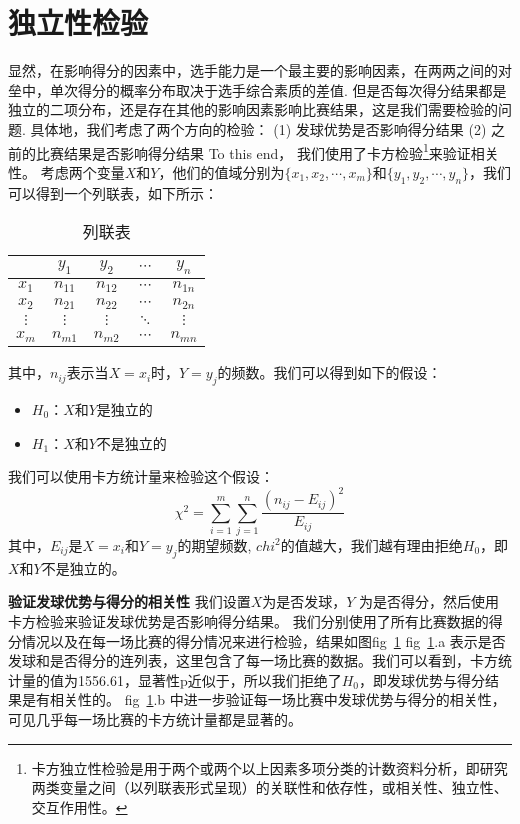 \documentclass{mcmthesis}
\begin{document}
\section{独立性检验}
显然，在影响得分的因素中，选手能力是一个最主要的影响因素，在两两之间的对垒中，单次得分的概率分布取决于选手综合素质的差值. 
但是否每次得分结果都是独立的二项分布，还是存在其他的影响因素影响比赛结果，这是我们需要检验的问题.
具体地，我们考虑了两个方向的检验：
(1) 发球优势是否影响得分结果
(2) 之前的比赛结果是否影响得分结果
To this end， 我们使用了卡方检验\footnote{卡方独立性检验是用于两个或两个以上因素多项分类的计数资料分析，即研究两类变量之间（以列联表形式呈现）的关联性和依存性，或相关性、独立性、交互作用性。}来验证相关性。
考虑两个变量$X$和$Y$，他们的值域分别为$\{x_1,x_2,\cdots,x_m\}$和$\{y_1,y_2,\cdots,y_n\}$，我们可以得到一个列联表，如下所示：
\begin{table}[h]
\centering
\caption{列联表}
\label{tab1}
\begin{tabular}{|c|c|c|c|c|}
\hline
 & $y_1$ & $y_2$ & $\cdots$ & $y_n$ \\ \hline
$x_1$ & $n_{11}$ & $n_{12}$ & $\cdots$ & $n_{1n}$ \\ \hline
$x_2$ & $n_{21}$ & $n_{22}$ & $\cdots$ & $n_{2n}$ \\ \hline
$\vdots$ & $\vdots$ & $\vdots$ & $\ddots$ & $\vdots$ \\ \hline
$x_m$ & $n_{m1}$ & $n_{m2}$ & $\cdots$ & $n_{mn}$ \\ \hline
\end{tabular}
\end{table}
其中，$n_{ij}$表示当$X=x_i$时，$Y=y_j$的频数。我们可以得到如下的假设：
\begin{itemize}
\item $H_0$：$X$和$Y$是独立的
\item $H_1$：$X$和$Y$不是独立的
\end{itemize}
我们可以使用卡方统计量来检验这个假设：
\begin{equation*}
\chi^2 = \sum_{i=1}^m\sum_{j=1}^n\frac{(n_{ij}-E_{ij})^2}{E_{ij}}
\end{equation*}
其中，$E_{ij}$是$X=x_i$和$Y=y_j$的期望频数, $chi^2$的值越大，我们越有理由拒绝$H_0$，即$X$和$Y$不是独立的。

\textbf{验证发球优势与得分的相关性} 
    我们设置$X$为是否发球，$Y$ 为是否得分，然后使用卡方检验来验证发球优势是否影响得分结果。
    我们分别使用了所有比赛数据的得分情况以及在每一场比赛的得分情况来进行检验，结果如图fig~\ref{}
    fig~\ref{}.a 表示是否发球和是否得分的连列表，这里包含了每一场比赛的数据。我们可以看到，卡方统计量的值为1556.61，显著性p近似于，所以我们拒绝了$H_0$，即发球优势与得分结果是有相关性的。
    fig~\ref{}.b 中进一步验证每一场比赛中发球优势与得分的相关性， 可见几乎每一场比赛的卡方统计量都是显著的。
\end{document}
